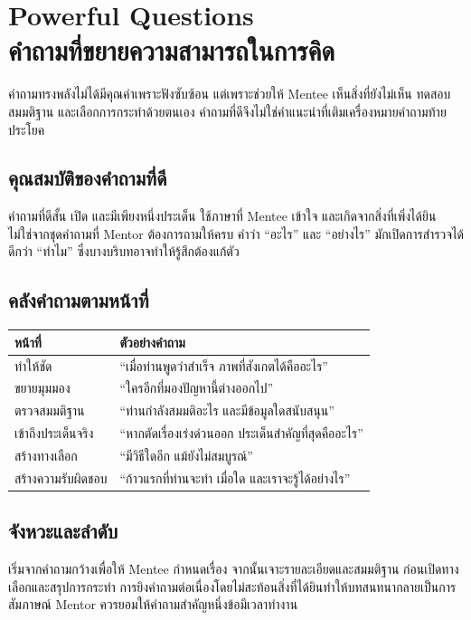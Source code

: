 \chapter{Powerful Questions\\คำถามที่ขยายความสามารถในการคิด}

คำถามทรงพลังไม่ได้มีคุณค่าเพราะฟังซับซ้อน แต่เพราะช่วยให้ Mentee เห็นสิ่งที่ยังไม่เห็น ทดสอบสมมติฐาน และเลือกการกระทำด้วยตนเอง คำถามที่ดีจึงไม่ใช่คำแนะนำที่เติมเครื่องหมายคำถามท้ายประโยค


\section{คุณสมบัติของคำถามที่ดี}
คำถามที่ดีสั้น เปิด และมีเพียงหนึ่งประเด็น ใช้ภาษาที่ Mentee เข้าใจ และเกิดจากสิ่งที่เพิ่งได้ยิน ไม่ใช่จากชุดคำถามที่ Mentor ต้องการถามให้ครบ คำว่า \enquote{อะไร} และ \enquote{อย่างไร} มักเปิดการสำรวจได้ดีกว่า \enquote{ทำไม} ซึ่งบางบริบทอาจทำให้รู้สึกต้องแก้ตัว

\section{คลังคำถามตามหน้าที่}
\begin{longtable}{P{.25\textwidth}P{.62\textwidth}}
\toprule
\textbf{หน้าที่} & \textbf{ตัวอย่างคำถาม}\\
\midrule
ทำให้ชัด & \enquote{เมื่อท่านพูดว่าสำเร็จ ภาพที่สังเกตได้คืออะไร}\\
ขยายมุมมอง & \enquote{ใครอีกที่มองปัญหานี้ต่างออกไป}\\
ตรวจสมมติฐาน & \enquote{ท่านกำลังสมมติอะไร และมีข้อมูลใดสนับสนุน}\\
เข้าถึงประเด็นจริง & \enquote{หากตัดเรื่องเร่งด่วนออก ประเด็นสำคัญที่สุดคืออะไร}\\
สร้างทางเลือก & \enquote{มีวิธีใดอีก แม้ยังไม่สมบูรณ์}\\
สร้างความรับผิดชอบ & \enquote{ก้าวแรกที่ท่านจะทำ เมื่อใด และเราจะรู้ได้อย่างไร}\\
\bottomrule
\end{longtable}

\section{จังหวะและลำดับ}
เริ่มจากคำถามกว้างเพื่อให้ Mentee กำหนดเรื่อง จากนั้นเจาะรายละเอียดและสมมติฐาน ก่อนเปิดทางเลือกและสรุปการกระทำ การยิงคำถามต่อเนื่องโดยไม่สะท้อนสิ่งที่ได้ยินทำให้บทสนทนากลายเป็นการสัมภาษณ์ Mentor ควรยอมให้คำถามสำคัญหนึ่งข้อมีเวลาทำงาน


